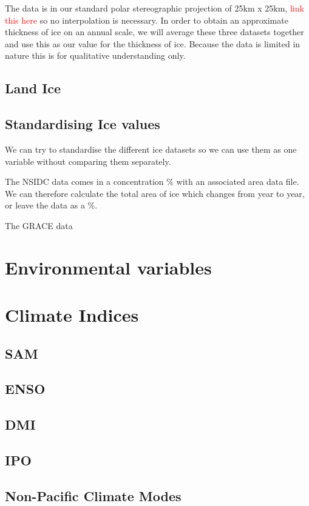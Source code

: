 \documentclass[../main.tex]{subfiles}
\begin{document}
The data is in our standard polar stereographic projection of 25km x 25km, \textcolor{red}{link this here} so no interpolation is necessary. In order to obtain an approximate thickness of ice on an annual scale, we will average these three datasets together and use this as our value for the thickness of ice. Because the data is limited in nature this is for qualitative understanding only.

\subsection*{Land Ice}
\subsection*{Standardising Ice values}

We can try to standardise the different ice datasets so we can use them as one variable without comparing them separately.

The NSIDC data comes in a concentration \% with an associated area data file. We can therefore calculate the total area of ice which changes from year to year, or leave the data as a \%.

The GRACE data



\section{Environmental variables}

\section{Climate Indices}
\subsection*{SAM}
\subsection*{ENSO}
\subsection*{DMI}
\subsection*{IPO}
\subsection*{Non-Pacific Climate Modes}
\end{document}
